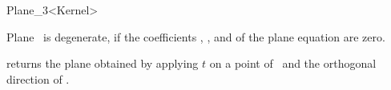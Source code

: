 \begin{ccRefClass} {Plane_3<Kernel>}
       {}

       {Plane \ccVar\ is degenerate, if the coefficients ,  
        , and  of the plane equation are zero.}


       {returns the plane obtained by applying $t$ on a point of \ccVar\ 
        and the orthogonal direction of \ccVar.}

\ccSeeAlso
{}

\end{ccRefClass} 
